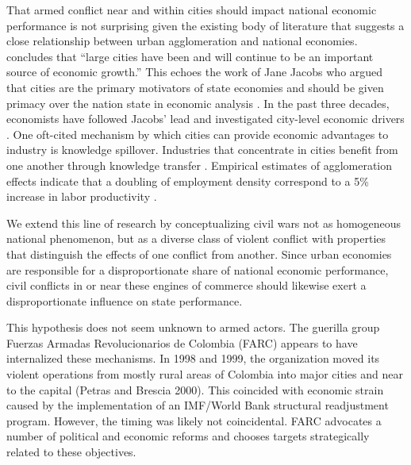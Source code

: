 That armed conflict near and within cities should impact national economic performance is not surprising given the existing body of literature that suggests a close relationship between urban agglomeration and national economies. \cite[p. 137]{quigley:1998} concludes that ``large cities have been and will continue to be an important source of economic growth.''  This echoes the work of Jane Jacobs who argued that cities are the primary motivators of state economies and should be given primacy over the nation state in economic analysis \citep{jacobs:1969,jacobs:1984}. In the past three decades, economists have followed Jacobs' lead and investigated city-level economic drivers \citep{lucas:1988, ciccone:hall:1996, begg:1999}. One oft-cited mechanism by which cities can provide economic advantages to industry is knowledge spillover. Industries that concentrate in cities benefit from one another through knowledge transfer \citep{jaffe:etal:1993, glaeser:1994, firestone:2010}. Empirical estimates of agglomeration effects indicate that a doubling of employment density correspond to a 5\% increase in labor productivity \citep{ciccone:hall:1996,ciccone:2002}. 


We extend this line of research by conceptualizing civil wars not as homogeneous national phenomenon, but as a diverse class of violent conflict with properties that distinguish the effects of one conflict from another. Since urban economies are responsible for a disproportionate share of national economic performance, civil conflicts in or near these engines of commerce should likewise exert a disproportionate influence on state performance. 

This hypothesis does not seem unknown to armed actors. The guerilla group Fuerzas Armadas Revolucionarios de Colombia (FARC) appears to have internalized these mechanisms. In 1998 and 1999, the organization moved its violent operations from mostly rural areas of Colombia into major cities and near to the capital (Petras and Brescia 2000). This coincided with economic strain caused by the implementation of an IMF/World Bank structural readjustment program. However, the timing was likely not coincidental. FARC advocates a number of political and economic reforms and chooses targets strategically related to these objectives.

